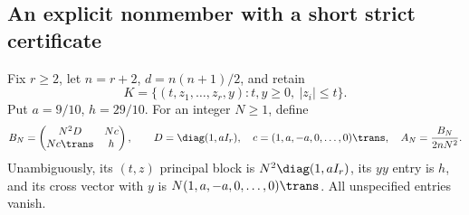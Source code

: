 \subsection{An explicit nonmember with a short strict certificate}
Fix $r\ge2$, let $n=r+2$, $d=n(n+1)/2$, and retain
\[
 K=\{(t,z_1,\ldots,z_r,y):t,y\ge0,\ |z_i|\le t\}.
\]
Put $a=9/10$, $h=29/10$. For an integer $N\ge1$, define
\begin{equation}\label{eq:allBN}
 B_N=\begin{pmatrix}N^2D&Nc\\Nc\trans&h\end{pmatrix},\qquad
 D=\diag(1,aI_r),\quad c=(1,a,-a,0,\ldots,0)\trans,\quad
 A_N=\frac{B_N}{2nN^2}.
\end{equation}
Unambiguously, its $(t,z)$ principal block is $N^2\diag(1,aI_r)$, its $yy$ entry is $h$, and its cross vector with $y$ is $N(1,a,-a,0,\ldots,0)\trans$. All unspecified entries vanish.

